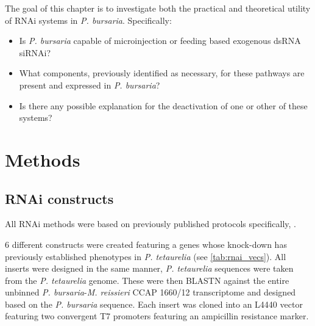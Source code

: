 The goal of this chapter is to investigate both the practical and
theoretical utility of RNAi systems in \textit{P. bursaria}. 
Specifically:
\begin{itemize}
    \item Is \textit{P. bursaria} capable of microinjection or feeding based
        exogenous dsRNA siRNAi?
    \item What components, previously identified as necessary, for these pathways
        are present and expressed in \textit{P. bursaria}? 
    \item Is there any possible explanation for the deactivation of one or other
        of these systems? 
\end{itemize}


\section{Methods}

\subsection{RNAi constructs}

All RNAi methods were based on previously published protocols specifically,
\citep{Galvani2001,Galvani2002,Beisson2010}.

6 different constructs were created featuring a genes whose knock-down
has previously established phenotypes in \textit{P. tetaurelia} (see \cref{tab:rnai_vecs}).
All inserts were designed in the same manner, \textit{P. tetaurelia} sequences
were taken from the \textit{P. tetaurelia} genome. 
These were then BLASTN against the entire unbinned \textit{P. bursaria}-\textit{M. reissieri}
CCAP 1660/12 transcriptome and designed based on the \textit{P. bursaria} sequence.
Each insert was cloned into an L4440 vector featuring two convergent T7 promoters
featuring an ampicillin resistance marker. 


